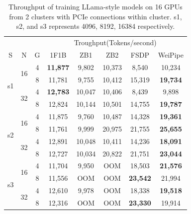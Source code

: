 \documentclass[sigplan,review,anonymous]{acmart}
\begin{document}
\begin{table}[!ht]
\centering
\begin{tabular}{ccc|ccccc}
\hline
\multicolumn{3}{c|}{}                         & \multicolumn{5}{c}{Troughput(Tokens/second)}                          \\
S                   & N                   & G & 1F1B            & ZB1    & ZB2    & FSDP            & WeiPipe         \\ \hline
\multirow{4}{*}{s1} & \multirow{2}{*}{16} & 4 & \textbf{11,877} & 9,802  & 10,373 & 8,540           & 10,234          \\
                    &                     & 8 & 11,781          & 9,755  & 10,412 & 15,319          & \textbf{19,734} \\
                    & \multirow{2}{*}{32} & 4 & \textbf{12,783} & 10,047 & 10,406 & 8,439           & 9,898           \\
                    &                     & 8 & 12,824          & 10,144 & 10,501 & 14,755          & \textbf{19,787} \\ \hline
\multirow{4}{*}{s2} & \multirow{2}{*}{16} & 4 & 11,875          & 9,760  & 10,487 & 14,328          & \textbf{19,361} \\
                    &                     & 8 & 11,761          & 9,999  & 20,975 & 21,755          & \textbf{25,655} \\
                    & \multirow{2}{*}{32} & 4 & 12,891          & 10,048 & 10,411 & 14,236          & \textbf{18,091} \\
                    &                     & 8 & 12,727          & 10,034 & 20,822 & 21,751          & \textbf{23,044} \\ \hline
\multirow{4}{*}{s3} & \multirow{2}{*}{16} & 4 & 11,704          & 9,950  & OOM    & 18,503          & \textbf{21,576} \\
                    &                     & 8 & 11,556          & OOM    & OOM    & \textbf{23,542} & 21,994          \\
                    & \multirow{2}{*}{32} & 4 & 12,610          & 9,978  & OOM    & 18,338          & \textbf{19,518} \\
                    &                     & 8 & 12,316          & OOM    & OOM    & \textbf{23,330} & 19,914          \\ \hline
\end{tabular}
\caption{Throughput of training LLama-style models on 16 GPUs from 2 clusters with PCIe connections within cluster. s1, s2, and s3 represents 4096, 8192, 16384 respectively.}
\label{tab:perform_pcie}
\end{table}
\end{document}
